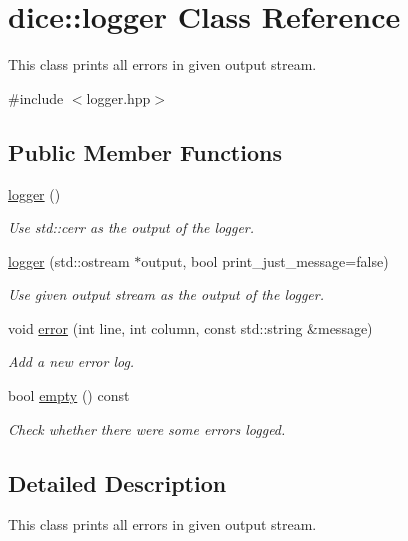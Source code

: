 \hypertarget{classdice_1_1logger}{}\section{dice\+:\+:logger Class Reference}
\label{classdice_1_1logger}


This class prints all errors in given output stream.  




{\ttfamily \#include $<$logger.\+hpp$>$}

\subsection*{Public Member Functions}
\begin{DoxyCompactItemize}
\item 
\mbox{\hyperlink{classdice_1_1logger_af96ff92a37f7376d0e96b2e3a65a0f6c}{logger}} ()
\begin{DoxyCompactList}\small\item\em Use std\+::cerr as the output of the logger. \end{DoxyCompactList}\item 
\mbox{\hyperlink{classdice_1_1logger_a945c88b202299d0fa387ffa5fe1d7bb9}{logger}} (std\+::ostream $\ast$output, bool print\+\_\+just\+\_\+message=false)
\begin{DoxyCompactList}\small\item\em Use given output stream as the output of the logger. \end{DoxyCompactList}\item 
void \mbox{\hyperlink{classdice_1_1logger_a5fb04ac776c40a57cee18ceb4fbdae9e}{error}} (int line, int column, const std\+::string \&message)
\begin{DoxyCompactList}\small\item\em Add a new error log. \end{DoxyCompactList}\item 
bool \mbox{\hyperlink{classdice_1_1logger_a7323ce67ddcf4d61f33ae000ec0421ac}{empty}} () const
\begin{DoxyCompactList}\small\item\em Check whether there were some errors logged. \end{DoxyCompactList}\end{DoxyCompactItemize}


\subsection{Detailed Description}
This class prints all errors in given output stream. 

